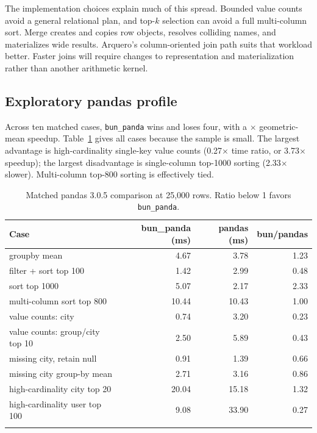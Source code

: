 \documentclass[pdflatex,sn-basic,Numbered]{sn-jnl}
\begin{document}
The implementation choices explain much of this spread. Bounded value counts avoid a general relational plan, and top-$k$ selection can avoid a full multi-column sort. Merge creates and copies row objects, resolves colliding names, and materializes wide results. Arquero's column-oriented join path suits that workload better. Faster joins will require changes to representation and materialization rather than another arithmetic kernel.

\subsection{Exploratory pandas profile}

Across ten matched cases, \texttt{bun\_panda} wins \PandasWins{} and loses four, with a \PandasGeoSpeedup{}$\times$ geometric-mean speedup. Table~\ref{tab:pandas} gives all cases because the sample is small. The largest advantage is high-cardinality single-key value counts (0.27$\times$ time ratio, or 3.73$\times$ speedup); the largest disadvantage is single-column top-1000 sorting (2.33$\times$ slower). Multi-column top-800 sorting is effectively tied.

\begin{table}[t]
\caption{Matched pandas 3.0.5 comparison at 25,000 rows. Ratio below 1 favors \texttt{bun\_panda}.}\label{tab:pandas}
\begin{tabular}{@{}lrrr@{}}
\toprule
Case & bun\_panda (ms) & pandas (ms) & bun/pandas \\
\midrule
groupby mean & 4.67 & 3.78 & 1.23 \\
filter + sort top 100 & 1.42 & 2.99 & 0.48 \\
sort top 1000 & 5.07 & 2.17 & 2.33 \\
multi-column sort top 800 & 10.44 & 10.43 & 1.00 \\
value counts: city & 0.74 & 3.20 & 0.23 \\
value counts: group/city top 10 & 2.50 & 5.89 & 0.43 \\
missing city, retain null & 0.91 & 1.39 & 0.66 \\
missing city group-by mean & 2.71 & 3.16 & 0.86 \\
high-cardinality city top 20 & 20.04 & 15.18 & 1.32 \\
high-cardinality user top 100 & 9.08 & 33.90 & 0.27 \\
\botrule
\end{tabular}
\end{table}
\end{document}
